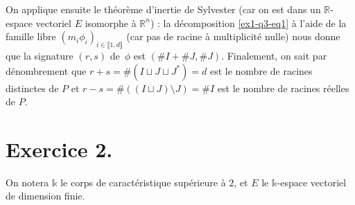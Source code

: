 \documentclass{../../td}
\begin{document}
\begin{enumerate}
      On applique ensuite le théorème d'inertie de Sylvester (car on est dans un $\mathds{R}$-espace vectoriel $E$ isomorphe à $\mathds{R}^n$) :
      la décomposition \ref{ex1-q3-eq1} à l'aide de la famille libre $(m_i\phi_i)_{i \in \llbracket 1,d\rrbracket}$ (car pas de racine à multiplicité nulle) nous donne que la signature $(r,s)$ de~$\phi$ est $(\#I + \#J, \#J)$.
      Finalement, on sait par dénombrement que $r + s = \#(I \sqcup J \sqcup J^*) = d$ est le nombre de racines distinctes de $P$ et $r - s = \#((I \sqcup J) \setminus J) = \#I$ est le nombre de racines réelles de $P$.
  \end{enumerate}

  \chapter*{Exercice 2.}

  On notera $\mathds{k}$ le corps de caractéristique supérieure à $2$, et $E$ le $\mathds{k}$-espace vectoriel de dimension finie.
\end{document}

